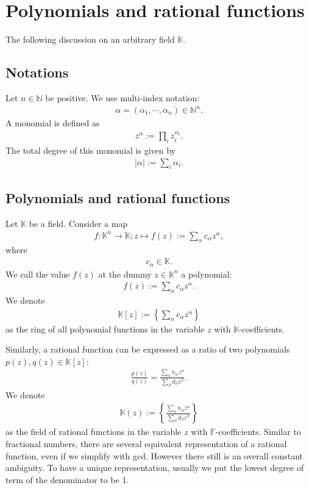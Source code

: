 \documentclass[11pt]{book}
\begin{document}
\section{Polynomials and rational functions}
The following discussion on an arbitrary field $\mathbb{K}$.

\subsection{Notations}
Let $n \in \mathbb{N}$ be positive. 
We use multi-index notation:
\begin{eqnarray}
\alpha = (\alpha_1, \cdots, \alpha_n) \in \mathbb{N}^n.
\end{eqnarray}
A monomial is defined as
\begin{eqnarray}
z^\alpha := \prod_i z_i^{\alpha_i}.
\end{eqnarray}
The total degree of this monomial is given by
\begin{eqnarray}
|\alpha| := \sum_i \alpha_i.
\end{eqnarray}

\subsection{Polynomials and rational functions}
Let $\mathbb{K}$ be a field.
Consider a map
\begin{eqnarray}
f : \mathbb{K}^n \to \mathbb{K}; z \mapsto f(z) := \sum_\alpha c_\alpha z^\alpha,
\end{eqnarray}
where
\begin{eqnarray}
c_\alpha \in \mathbb{K}.
\end{eqnarray}
We call the value $f(z)$ at the dummy $z \in \mathbb{K}^n$ a polynomial:
\begin{eqnarray}
f(z) := \sum_\alpha c_\alpha z^\alpha.
\end{eqnarray}
We denote
\begin{eqnarray}
\mathbb{K}[z] := \left\{ \sum_\alpha c_\alpha z^\alpha \right\}
\end{eqnarray}
as the ring of all polynomial functions in the variable $z$ with $\mathbb{K}$-coefficients.

Similarly, a rational function can be expressed as a ratio of two polynomials $p(z),q(z) \in \mathbb{K}[z]$:
\begin{eqnarray}
\frac{p(z)}{q(z)} = \frac{\sum_\alpha n_\alpha z^\alpha}{\sum_\beta d_\beta z^\beta}.
\end{eqnarray}
We denote
\begin{eqnarray}
\mathbb{K}(z) := \left\{ \frac{\sum_\alpha n_\alpha z^\alpha}{\sum_\beta d_\beta z^\beta} \right\}
\end{eqnarray}
as the field of rational functions in the variable $z$ with $\mathbb{F}$-coefficients.
Similar to fractional numbers, there are several equivalent representation of a rational function, even if we simplify with gcd.
However there still is an overall constant ambiguity.
To have a unique representation, usually we put the lowest degree of term of the denominator to be 1.
\end{document}
